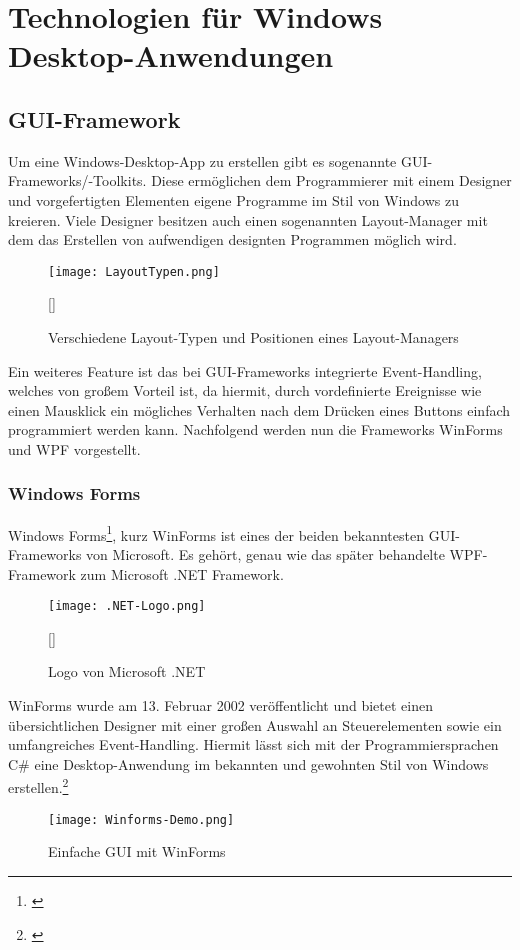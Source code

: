 \chapter{Technologien für Windows Desktop-Anwendungen}
\label{chap:TechnologienfürWindowsDesktop-Anwendungen}

\section{GUI-Framework}

Um eine Windows-Desktop-App zu erstellen gibt es sogenannte GUI-Frameworks/-Toolkits. Diese ermöglichen dem Programmierer mit einem Designer und vorgefertigten Elementen eigene Programme im Stil von Windows zu kreieren. 
Viele Designer besitzen auch einen sogenannten Layout-Manager mit dem das Erstellen von aufwendigen designten Programmen möglich wird. 
\\
\begin{figure}[H]
    \centering
    \texttt{[image: LayoutTypen.png]}
    \caption[Layout-Typen]{Verschiedene Layout-Typen und Positionen eines Layout-Managers}[\cite{Layout}]
\end{figure}
\noindent 
Ein weiteres Feature ist das bei GUI-Frameworks integrierte Event-Handling, welches von großem Vorteil ist, da hiermit, durch vordefinierte Ereignisse wie einen Mausklick ein mögliches Verhalten nach dem Drücken eines Buttons einfach programmiert werden kann.
Nachfolgend werden nun die Frameworks WinForms und WPF vorgestellt.

\subsection{Windows Forms}

Windows Forms\footnote[1]{\cite[Vgl.][]{WindowsForms1}}, kurz WinForms ist eines der beiden bekanntesten GUI-Frameworks von Microsoft. Es gehört, genau wie das später behandelte WPF-Framework zum Microsoft 
.NET Framework.
\\
\begin{figure}[H]
    \centering
    \texttt{[image: .NET-Logo.png]}
    \caption[.Net-Logo]{Logo von Microsoft .NET}[\cite{DotNet}]
\end{figure}
\noindent
WinForms wurde am 13. Februar 2002 veröffentlicht und bietet einen übersichtlichen Designer mit einer großen Auswahl an Steuerelementen sowie ein umfangreiches Event-Handling. Hiermit lässt sich mit der Programmiersprachen C\# eine Desktop-Anwendung im bekannten und gewohnten Stil von Windows erstellen.\footnote[2]{\cite[Vgl.][]{WindowsForms2}}
\\
\begin{figure}[H]
    \centering
    \texttt{[image: Winforms-Demo.png]}
    \caption{Einfache GUI mit WinForms} 
\end{figure}

